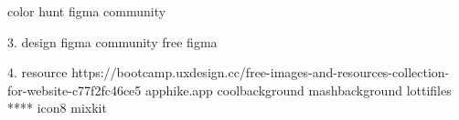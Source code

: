 color hunt
figma community 

3. design 
figma community
free figma


4. resource
https://bootcamp.uxdesign.cc/free-images-and-resources-collection-for-website-c77f2fc46ce5
apphike.app
coolbackground
mashbackground
lottifiles ****
icon8
mixkit
